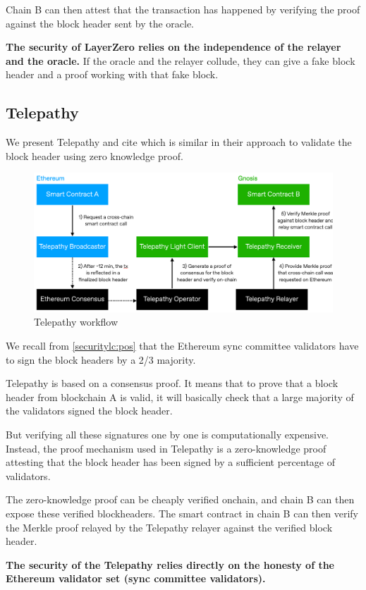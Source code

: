 Chain B can then attest that the transaction has happened by verifying the proof against the block header sent by the oracle. 

\textbf{The security of LayerZero relies on the independence of the relayer and the oracle.} If the oracle and the relayer collude, they can give a fake block header and a proof working with that fake block. 


\subsection{Telepathy \cite{telepathy}}
We present Telepathy and cite \cite{xie2022zkbridge} which is similar in their approach to validate the block header using zero knowledge proof.
\begin{figure}[H]
    \centering
    \includegraphics[width=0.8\linewidth]{interoperability/telepathy.png}
    \caption{Telepathy workflow \cite{telepathy}}
    \label{fig:telepathy}
\end{figure}

We recall from \ref{securitylc:pos} that the Ethereum sync committee validators have to sign the block headers by a 2/3 majority.

Telepathy is based on a consensus proof. It means that to prove that a block header from blockchain A is valid, it will basically check that a large majority of the validators signed the block header. 

But verifying all these signatures one by one is computationally expensive. Instead, the proof mechanism used in Telepathy is a zero-knowledge proof attesting that the block header has been signed by a sufficient percentage of validators. 

The zero-knowledge proof can be cheaply verified onchain, and chain B can then expose these verified blockheaders.
The smart contract in chain B can then verify the Merkle proof relayed by the Telepathy relayer against the verified block header.

\textbf{The security of the Telepathy relies directly on the honesty of the Ethereum validator set (sync committee validators).
}
\iffalse


